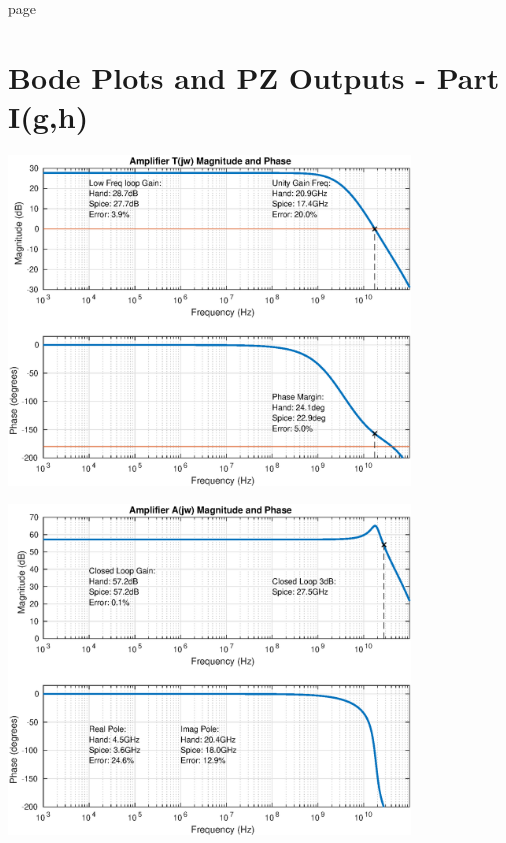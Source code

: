 \documentclass[12pt,a4paper]{article}
\begin{document}
\pagebreak
page
\pagebreak



\section{Bode Plots and PZ Outputs - Part I(g,h)}

{\centering
	\includegraphics[width=0.8\textwidth]{plots/part_g.eps}
\par}

\pagebreak

{\centering
	\includegraphics[width=0.8\textwidth]{plots/part_h.eps}
\par}
\end{document}
